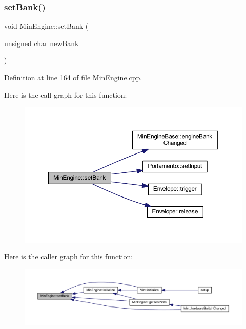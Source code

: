 \subsubsection{\texorpdfstring{set\+Bank()}{setBank()}}
{\footnotesize\ttfamily void Min\+Engine\+::set\+Bank (\begin{DoxyParamCaption}\item[{unsigned char}]{new\+Bank }\end{DoxyParamCaption})}



Definition at line 164 of file Min\+Engine.\+cpp.

Here is the call graph for this function\+:
\nopagebreak
\begin{figure}[H]
\begin{center}
\leavevmode
\includegraphics[width=350pt]{d4/d0f/class_min_engine_ac76abe71fbd84b163b68fc7b12fb1a26_cgraph}
\end{center}
\end{figure}
Here is the caller graph for this function\+:
\nopagebreak
\begin{figure}[H]
\begin{center}
\leavevmode
\includegraphics[width=350pt]{d4/d0f/class_min_engine_ac76abe71fbd84b163b68fc7b12fb1a26_icgraph}
\end{center}
\end{figure}
\mbox{\label{class_min_engine_a33949965a982b0d8e690ebc781e33977}} 
